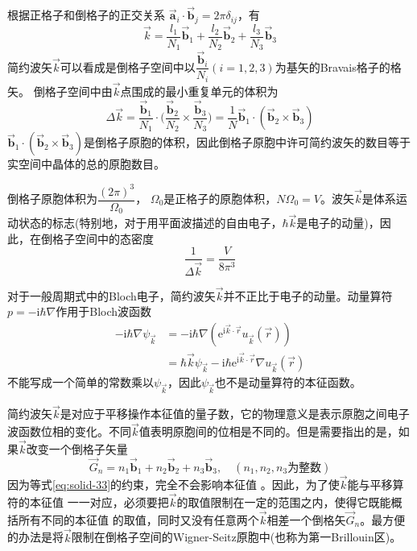 根据正格子和倒格子的正交关系%
$\vec{\mathbf a}_i\cdot\vec{\mathbf b}_j=2\pi\delta_{ij}$，有
\begin{equation}
  \vec k=\dfrac{l_1}{N_1}\vec{\mathbf b}_1+\dfrac{l_2}{N_2}\vec{\mathbf b}_2+\dfrac{l_3}{N_3}\vec{\mathbf b}_3
  \label{eq:solid-36}
\end{equation}
简约波矢$\vec k$可以看成是倒格子空间中以$\dfrac{\vec{\mathbf b}_i}{N_i}(i=1,2,3)$为基矢的\textrm{Bravais}格子的格矢。
倒格子空间中由$\vec k$点围成的最小重复单元的体积为
\begin{equation}
  \Delta\vec k=\dfrac{\vec{\mathbf b}_1}{N_1}\cdot\biggl(\dfrac{\vec{\mathbf b}_2}{N_2}\times\dfrac{\vec{\mathbf b}_3}{N_3}\biggr)=\dfrac1N\vec{\mathbf b}_1\cdot(\vec{\mathbf b}_2\times\vec{\mathbf b}_3)
  \label{eq:solid-37}
\end{equation}
$\vec{\mathbf b}_1\cdot(\vec{\mathbf b}_2\times\vec{\mathbf b}_3)$是倒格子原胞的体积，因此倒格子原胞中许可简约波矢的数目等于实空间中晶体的总的原胞数目。

倒格子原胞体积为$\dfrac{(2\pi)^3}{\Omega_0}$，%
$\Omega_0$是正格子的原胞体积，$N\Omega_0=V$。波矢$\vec k$是体系运动状态的标志(特别地，对于用平面波描述的自由电子，$\hbar\vec k$是电子的动量\cite{Yanshousheng})，因此，在倒格子空间中的态密度
\begin{equation}
  \dfrac1{\Delta\vec k}=\dfrac V{8\pi^3}
  \label{eq:solid-38}
\end{equation}

对于一般周期式中的\textrm{Bloch}电子，简约波矢$\vec k$并不正比于电子的动量。动量算符$p=-\mathrm{i}\hbar\nabla$作用于\textrm{Bloch}波函数%
\begin{equation}
  \begin{split}
	  -\mathrm{i}\hbar\nabla\psi_{\vec k}&=-\mathrm{i}\hbar\nabla(\mathrm{e}^{\mathrm{i}\vec k\cdot\vec r}u_{\vec k}(\vec r))\\
	  &=\hbar\vec k\psi_{\vec k}-\mathrm{i}\hbar \mathrm{e}^{\mathrm{i}\vec k\cdot\vec r}\nabla u_{\vec k}(\vec r)
  \end{split}
  \label{eq:solid-39}
\end{equation}
不能写成一个简单的常数乘以$\psi_{\vec k}$，因此$\psi_{\vec k}$也不是动量算符的本征函数。

简约波矢$\vec k$是对应于平移操作本征值的量子数，它的物理意义是表示原胞之间电子波函数位相的变化。不同$\vec k$值表明原胞间的位相是不同的。但是需要指出的是，如果$\vec k$改变一个倒格子矢量
\begin{displaymath}
  \vec G_n=n_1\vec{\mathbf b}_1+n_2\vec{\mathbf b}_2+n_3\vec{\mathbf b}_3,\quad(n_1,n_2,n_3\mbox{为整数})
\end{displaymath}
因为等式\eqref{eq:solid-33}的约束，完全不会影响本征值%
。因此，为了使$\vec k$能与平移算符的本征值%
一一对应，必须要把$\vec k$的取值限制在一定的范围之内，使得它既能概括所有不同的本征值%
的取值，同时又没有任意两个$\vec k$相差一个倒格矢$\vec G_n$。最方便的办法是将$\vec k$限制在倒格子空间的\textrm{Wigner-Seitz}原胞中(也称为第一\textrm{Brillouin}区)。

